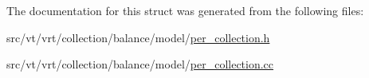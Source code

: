 The documentation for this struct was generated from the following files\+:\begin{DoxyCompactItemize}
\item 
src/vt/vrt/collection/balance/model/\hyperlink{per__collection_8h}{per\+\_\+collection.\+h}\item 
src/vt/vrt/collection/balance/model/\hyperlink{per__collection_8cc}{per\+\_\+collection.\+cc}\end{DoxyCompactItemize}
